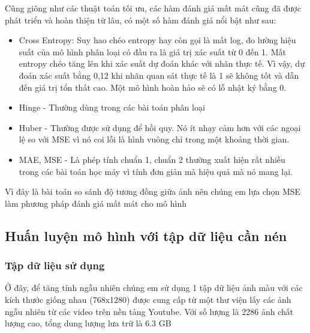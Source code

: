 Cũng giông như các thuật toán tối ưu, các hàm đánh giá mất mát cũng đã được phát triển và
hoàn thiện từ lâu, có một số hàm đánh giá nổi bật như sau:
\begin{itemize}
    \item Cross Entropy: Suy hao chéo entropy hay còn gọi là mất log, đo lường hiệu suất của mô hình phân loại có đầu ra là giá
          trị xác suất từ 0 đến 1. Mất entropy chéo tăng lên khi xác suất dự đoán khác với nhãn thực tế. Vì vậy,
          dự đoán xác suất bằng 0,12 khi nhãn quan sát thực tế là 1 sẽ không tốt và dẫn đến giá trị tổn thất cao.
          Một mô hình hoàn hảo sẽ có lỗ nhật ký bằng 0.
    \item Hinge - Thường dùng trong các bài toán phân loại
    \item Huber - Thường được sử dụng để hồi quy. Nó ít nhạy cảm hơn với các ngoại lệ so với MSE vì nó coi lỗi là hình vuông chỉ trong một khoảng thời gian.
    \item MAE, MSE - Là phép tính chuẩn 1, chuẩn 2 thường xuất hiện rất nhiều trong các bài
          toán học máy vì tính đơn giản mà hiệu quả mà nó mang lại.
\end{itemize}

Vì đây là bài toán so sánh độ tương đồng giữa ảnh nên chúng em lựa chọn MSE làm phương pháp đánh giá mất mát cho mô hình


\subsection{Huấn luyện mô hình với tập dữ liệu cần nén}
\subsubsection{Tập dữ liệu sử dụng}

Ở đây, để tăng tính ngẫu nhiên chúng em sử dụng 1 tập dữ liệu ảnh màu với các
kích thước giống nhau (768x1280) được cung cấp từ một thư viện lấy các ảnh ngẫu
nhiên từ các video trên nền tảng Youtube. Với số lượng là 2286 ảnh chất
lượng cao, tổng dung lượng lưa trữ là 6.3 GB

